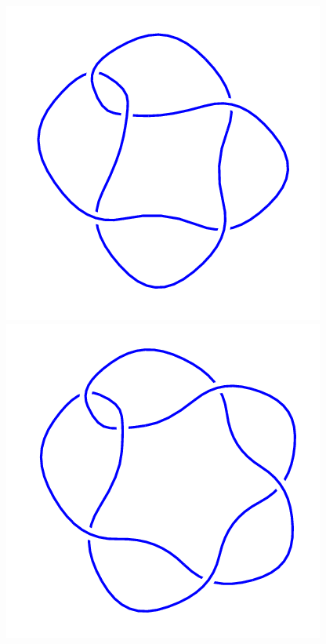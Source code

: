\begin{figure}[H]
\begin{minipage}[b]{.18\linewidth}
    \end{minipage}
    \begin{minipage}[b]{.18\linewidth}
        \centering
        \includegraphics[width=\linewidth]{../data/5_2.png}
    \end{minipage}
    \begin{minipage}[b]{.18\linewidth}
        \centering
        \includegraphics[width=\linewidth]{../data/6_1.png}
    \end{minipage}
\end{figure}

